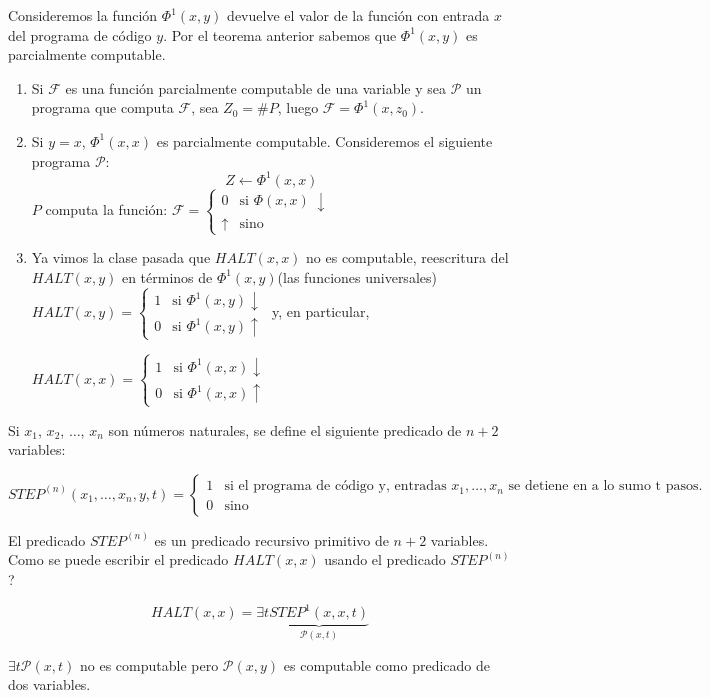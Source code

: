 \begin{observation}
Consideremos la funci\'on $\Phi^{1}(x, y)$ devuelve el valor de la funci\'on con entrada $x$ del programa de c\'odigo $y$. Por el teorema anterior sabemos que $\Phi^{1}(x, y)$ es parcialmente computable.
 
\begin{enumerate}
	\item Si $\mathcal{F}$ es una funci\'on parcialmente computable de una variable y sea $\mathcal{P}$ un programa que computa $\mathcal{F}$, sea $Z_0 = \# P$, luego $\mathcal{F} = \Phi^{1}(x, z_0)$.
	\item Si $y = x$, $\Phi^{1}(x, x)$ es parcialmente computable. Consideremos el siguiente programa $\mathcal{P}$:
	\[
	Z \leftarrow \Phi^{1}(x, x)
	\]
	$P$ computa la funci\'on:	
	\(
	\mathcal{F} =
	\begin{cases}
	0			&\text{si } \Phi(x, x)\; \downarrow	\\
	\uparrow	&\text{sino }
	\end{cases}
	\)
	\item Ya vimos la clase pasada que $HALT(x, x)$ no es computable, reescritura del $HALT(x, y)$ en t\'erminos de $\Phi^{1}(x, y)$(las funciones universales)
	\(
	HALT(x, y) =
	\begin{cases}
	1			&\text{si } \Phi^{1}(x, y) \downarrow	\\
	0			&\text{si }	\Phi^{1}(x, y)	\uparrow
	\end{cases}
	\)	
	y, en particular,
	
	\(
	HALT(x, x) =
	\begin{cases}
	1			&\text{si } \Phi^{1}(x, x) \downarrow	\\
	0			&\text{si }	\Phi^{1}(x, x)	\uparrow
	\end{cases}
	\)
\end{enumerate}
\end{observation}
 
\begin{definition}
Si $x_1$, $x_2$, $\ldots$, $x_n$ son n\'umeros naturales, se define el siguiente predicado de $n+ 2$ variables:
 
\[
STEP^{(n)}(x_1, \ldots, x_n, y, t) =
\begin{cases}
1				&\text{si el programa de c\'odigo y, entradas $x_1, \ldots, x_n$ se detiene en a lo sumo t pasos.}\\
0				&\text{sino}
 
\end{cases}
\]
\end{definition}
 
\begin{theorem}
El predicado $STEP^{(n)}$ es un predicado recursivo primitivo de $n + 2$ variables. \textquestiondown Como se puede escribir el predicado $HALT(x, x)$ usando el predicado $STEP^{(n)}$?
 
\[
HALT(x, x) = \exists t \underbrace{STEP^{1}(x, x, t)}_{\mathcal{P}(x, t)}
\]
 
$\exists t \mathcal{P}(x, t)$ no es computable pero $\mathcal{P}(x, y)$ es computable como predicado de dos variables.
\end{theorem}
 
